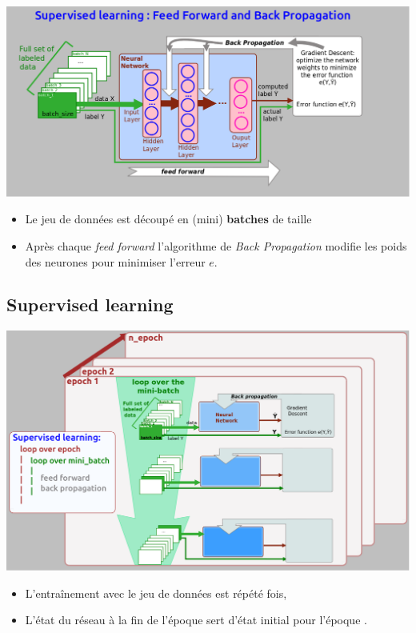 \documentclass[10pt,serif,mathserif,compress,hyperref={colorlinks}]{beamer}
\begin{document}
\begin{frame}{}
  \includegraphics[width=1.2\textwidth]{./images/NetworkTraining.png}
  \vspace*{-3mm}\begin{itemize}
  \item Le jeu de données est découpé en (mini) {\bf batches} de taille 
  \item Après chaque {\em feed forward} l'algorithme de {\em Back Propagation} modifie les poids
    des neurones pour minimiser l'erreur $e$.
  \end{itemize}
\end{frame}

\subsection{Supervised learning}

\begin{frame}{}
  \includegraphics[width=\textwidth]{./images/NetworkTraining_2.png}
  \vspace*{-3mm}\begin{itemize}
  \item L'entraînement avec le jeu de données est répété  fois,
  \item L'état du réseau à la fin de l'époque  sert d'état initial pour l'époque .
  \end{itemize}
  
\end{frame}
\end{document}
